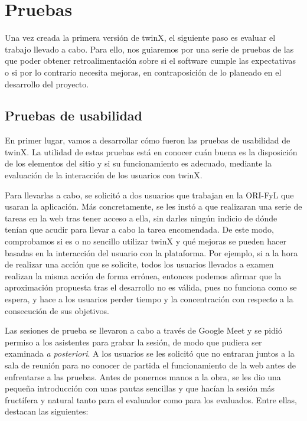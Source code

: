 \chapter{Pruebas}
\label{pruebas}

Una vez creada la primera versión de twinX, el siguiente paso es evaluar el trabajo llevado a cabo. Para ello, nos guiaremos por una serie de pruebas de las que poder obtener retroalimentación sobre si el software cumple las expectativas o si por lo contrario necesita mejoras, en contraposición de lo planeado en el desarrollo del proyecto.

\section{Pruebas de usabilidad}

En primer lugar, vamos a desarrollar cómo fueron las pruebas de usabilidad de twinX. La utilidad de estas pruebas está en conocer cuán buena es la disposición de los elementos del sitio y si su funcionamiento es adecuado, mediante la evaluación de la interacción de los usuarios con twinX.

Para llevarlas a cabo, se solicitó a dos usuarios que trabajan en la ORI-FyL que usaran la aplicación. Más concretamente, se les instó a que realizaran una serie de tareas en la web tras tener acceso a ella, sin darles ningún indicio de dónde tenían que acudir para llevar a cabo la tarea encomendada. De este modo, comprobamos si es o no sencillo utilizar twinX y qué mejoras se pueden hacer basadas en la interacción del usuario con la plataforma. Por ejemplo, si a la hora de realizar una acción que se solicite, todos los usuarios llevados a examen realizan la misma acción de forma errónea, entonces podemos afirmar que la aproximación propuesta tras el desarrollo no es válida, pues no funciona como se espera, y hace a los usuarios perder tiempo y la concentración con respecto a la consecución de sus objetivos.

Las sesiones de prueba se llevaron a cabo a través de Google Meet \cite{googlemeet} y se pidió permiso a los asistentes para grabar la sesión, de modo que pudiera ser examinada \textit{a posteriori}. A los usuarios se les solicitó que no entraran juntos a la sala de reunión para no conocer de partida el funcionamiento de la web antes de enfrentarse a las pruebas. Antes de ponernos manos a la obra, se les dio una pequeña introducción con unas pautas sencillas \cite{krug} y que hacían la sesión más fructífera y natural tanto para el evaluador como para los evaluados. Entre ellas, destacan las siguientes:

